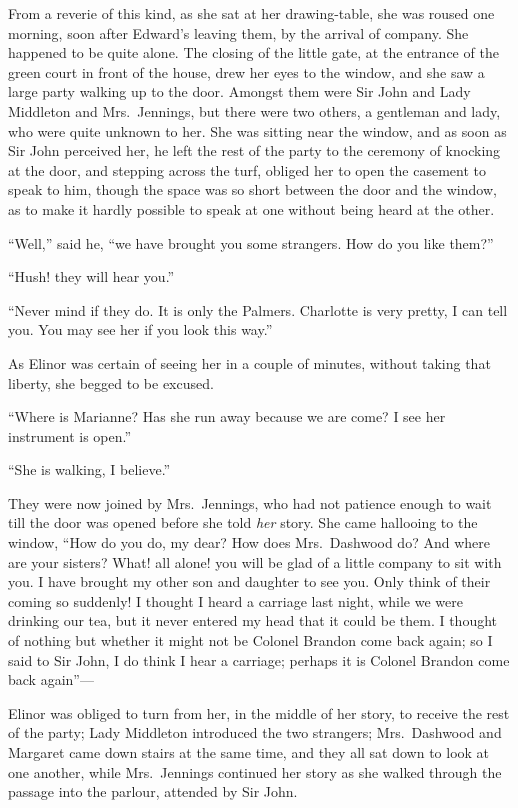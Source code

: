 From a reverie of this kind, as she sat at her
drawing-table, she was roused one morning, soon after
Edward's leaving them, by the arrival of company.
She happened to be quite alone.  The closing of the
little gate, at the entrance of the green court in front
of the house, drew her eyes to the window, and she saw
a large party walking up to the door.  Amongst them
were Sir John and Lady Middleton and Mrs.\ Jennings,
but there were two others, a gentleman and lady, who were
quite unknown to her.  She was sitting near the window,
and as soon as Sir John perceived her, he left the rest
of the party to the ceremony of knocking at the door,
and stepping across the turf, obliged her to open the
casement to speak to him, though the space was so short
between the door and the window, as to make it hardly
possible to speak at one without being heard at the other.

``Well,'' said he, ``we have brought you some strangers.
How do you like them?''

``Hush! they will hear you.''

``Never mind if they do.  It is only the Palmers.
Charlotte is very pretty, I can tell you.  You may see her
if you look this way.''

As Elinor was certain of seeing her in a couple
of minutes, without taking that liberty, she begged
to be excused.

``Where is Marianne? Has she run away because we
are come? I see her instrument is open.''

``She is walking, I believe.''

They were now joined by Mrs.\ Jennings, who had not
patience enough to wait till the door was opened before
she told \emph{her} story.  She came hallooing to the window,
``How do you do, my dear?  How does Mrs.\ Dashwood do?
And where are your sisters?  What! all alone! you
will be glad of a little company to sit with you.
I have brought my other son and daughter to see you.
Only think of their coming so suddenly!  I thought I heard
a carriage last night, while we were drinking our tea,
but it never entered my head that it could be them.
I thought of nothing but whether it might not be Colonel
Brandon come back again; so I said to Sir John, I do think
I hear a carriage; perhaps it is Colonel Brandon come
back again''---%

Elinor was obliged to turn from her, in the middle
of her story, to receive the rest of the party; Lady
Middleton introduced the two strangers; Mrs.\ Dashwood
and Margaret came down stairs at the same time, and they
all sat down to look at one another, while Mrs.\ Jennings
continued her story as she walked through the passage
into the parlour, attended by Sir John.

